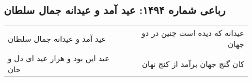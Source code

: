 \begin{center}
\section*{رباعی شماره ۱۴۹۴: عید آمد و عیدانه جمال سلطان}
\label{sec:1494}
\begin{longtable}{l p{0.5cm} r}
عید آمد و عیدانه جمال سلطان
&&
عیدانه که دیده است چنین در دو جهان
\\
عید این بود و هزار عید ای دل و جان
&&
کان گنج جهان برآمد از کنج نهان
\\
\end{longtable}
\end{center}
